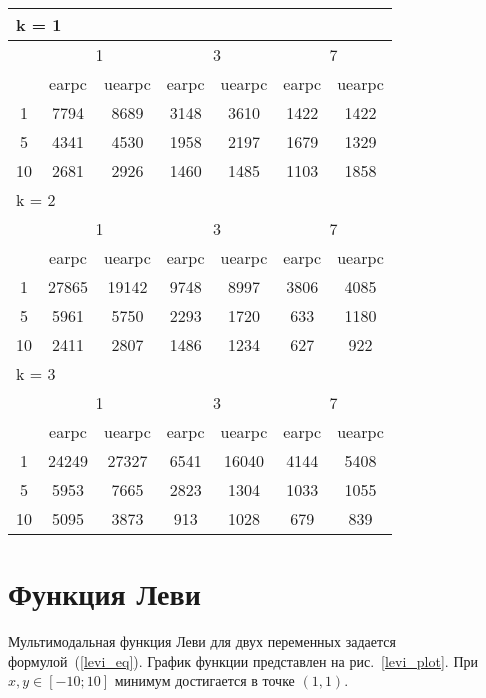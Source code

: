 \begin{table}
 \begin{tabular}{|*7{c|}}
\hline
\multicolumn{7}{|l|}{k = 1} \\
\hline
\multirow{2}{*}{\diagbox{$\mu$}{$\lambda$}} & \multicolumn{2}{c|}{1} & \multicolumn{2}{c|}{3} & \multicolumn{2}{c|}{7} \\
\cline{2-7}
 & earpc & uearpc & earpc & uearpc & earpc & uearpc \\
\hline
1 & 7794 & 8689 & 3148 & 3610 & 1422 & 1422 \\
\hline
5 & 4341 & 4530 & 1958 & 2197 & 1679 & 1329 \\
\hline
10 & 2681 & 2926 & 1460 & 1485 & 1103 & 1858 \\
\hline
\multicolumn{7}{|l|}{k = 2} \\
\hline
\multirow{2}{*}{\diagbox{$\mu$}{$\lambda$}} & \multicolumn{2}{c|}{1} & \multicolumn{2}{c|}{3} & \multicolumn{2}{c|}{7} \\
\cline{2-7}
 & earpc & uearpc & earpc & uearpc & earpc & uearpc \\
\hline
1 & 27865 & 19142 & 9748 & 8997 & 3806 & 4085 \\
\hline
5 & 5961 & 5750 & 2293 & 1720 & 633 & 1180 \\
\hline
10 & 2411 & 2807 & 1486 & 1234 & 627 & 922 \\
\hline
\multicolumn{7}{|l|}{k = 3} \\
\hline
\multirow{2}{*}{\diagbox{$\mu$}{$\lambda$}} & \multicolumn{2}{c|}{1} & \multicolumn{2}{c|}{3} & \multicolumn{2}{c|}{7} \\
\cline{2-7}
 & earpc & uearpc & earpc & uearpc & earpc & uearpc \\
\hline
1 & 24249 & 27327 & 6541 & 16040 & 4144 & 5408 \\
\hline
5 & 5953 & 7665 & 2823 & 1304 & 1033 & 1055 \\
\hline
10 & 5095 & 3873 & 913 & 1028 & 679 & 839 \\
\hline
\end{tabular}
\end{table}

\section{Функция Леви}

Мультимодальная функция Леви для двух переменных задается формулой~(\ref{levi_eq}). График функции представлен на рис.~\ref{levi_plot}. При $x, y \in [-10; 10]$ минимум достигается в точке $(1, 1)$.

